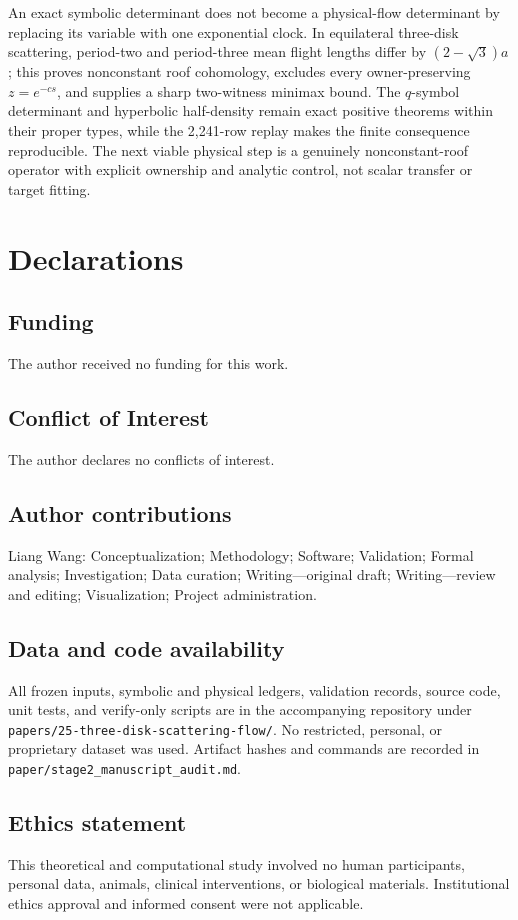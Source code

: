 \documentclass[11pt,a4paper]{article}
\theoremstyle{definition}
\theoremstyle{remark}
\begin{document}
An exact symbolic determinant does not become a physical-flow determinant by replacing its variable with one exponential clock. In equilateral three-disk scattering, period-two and period-three mean flight lengths differ by \((2-\sqrt3)a\); this proves nonconstant roof cohomology, excludes every owner-preserving \(z=e^{-cs}\), and supplies a sharp two-witness minimax bound. The \(q\)-symbol determinant and hyperbolic half-density remain exact positive theorems within their proper types, while the 2,241-row replay makes the finite consequence reproducible. The next viable physical step is a genuinely nonconstant-roof operator with explicit ownership and analytic control, not scalar transfer or target fitting.

\section*{Declarations}
\subsection*{Funding}
The author received no funding for this work.
\subsection*{Conflict of Interest}
The author declares no conflicts of interest.
\subsection*{Author contributions}
Liang Wang: Conceptualization; Methodology; Software; Validation; Formal analysis; Investigation; Data curation; Writing---original draft; Writing---review and editing; Visualization; Project administration.
\subsection*{Data and code availability}
All frozen inputs, symbolic and physical ledgers, validation records, source code, unit tests, and verify-only scripts are in the accompanying repository under \texttt{papers/25-three-disk-scattering-flow/}. No restricted, personal, or proprietary dataset was used. Artifact hashes and commands are recorded in \texttt{paper/stage2\_manuscript\_audit.md}.
\subsection*{Ethics statement}
This theoretical and computational study involved no human participants, personal data, animals, clinical interventions, or biological materials. Institutional ethics approval and informed consent were not applicable.
\end{document}
